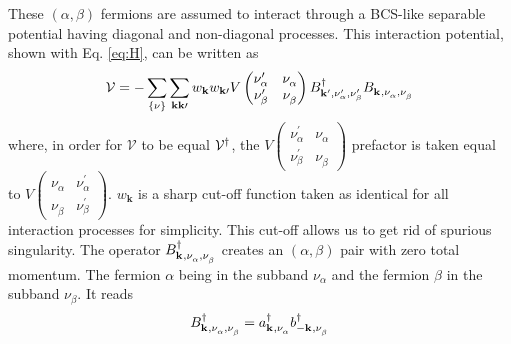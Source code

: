 \documentclass[11pt]{article} %
\begin{document}
These $(\alpha,\beta)$ fermions are assumed to interact through a BCS-like separable potential having diagonal and non-diagonal processes.  This interaction potential, shown with Eq. \ref{eq:H}, can be written as 
\begin{equation}\label{eq:V}
\mathcal{V}=-\sum_{\{\nu\}}\sum_{\mathbf{k}\mathbf{k}{\prime}}w_{\mathbf{k}}w_{\mathbf{k}{\prime}}V 
\begin{pmatrix}
\nu_{\alpha}^{{\prime}}&\nu_{\alpha}^{}\\
\nu_{\beta}^{{\prime}}&\nu_{\beta}^{}
\end{pmatrix}
B^{\dagger}_{\mathbf{k}^{{\prime}},\nu_{\alpha}^{{\prime}},\nu_{\beta}^{{\prime}}}
B^{}_{\mathbf{k}^{ },\nu_{\alpha}^{},\nu_{\beta}^{}}
\end{equation}
where, in order for $\mathcal{V}$ to be equal  $\mathcal{V}^{\dagger}$, the $V 
\left(\begin{smallmatrix}
\nu_{\alpha}^{{\prime}}&\nu_{\alpha}^{}\\
\nu_{\beta}^{{\prime}}&\nu_{\beta}^{}
\end{smallmatrix}\right)$ prefactor is taken equal to $V 
\left(\begin{smallmatrix}
\nu_{\alpha}^{}&\nu_{\alpha}^{{\prime}}\\
\nu_{\beta}^{}&\nu_{\beta}^{{\prime}}
\end{smallmatrix}\right)$. 
$w_{\mathbf{k}}$ is a sharp cut-off function taken as identical for all interaction processes for simplicity. This cut-off allows us to get rid of spurious singularity.  The operator   $B^{\dagger}_{\mathbf{k}^{ },\nu_{\alpha}^{},\nu_{\beta}^{}}$ creates an $(\alpha,\beta)$ pair with zero total momentum. The fermion $\alpha$ being in the subband $\nu_{\alpha}$ and the fermion $\beta$ in the subband $\nu_{\beta}$.  It reads 
\begin{equation}
B^{\dagger}_{\mathbf{k}^{ },\nu_{\alpha}^{},\nu_{\beta}^{}}=a^{\dagger}_{\mathbf{k}^{ },\nu_{\alpha}^{}}
b^{\dagger}_{-\mathbf{k}^{ },\nu_{\beta}^{}}
\end{equation}
\end{document}
